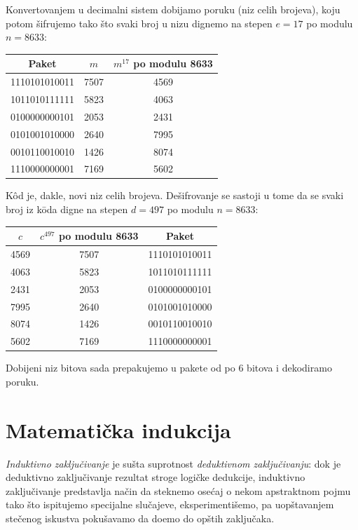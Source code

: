   Konvertovanjem u decimalni sistem dobijamo poruku (niz celih brojeva), koju potom \v sifrujemo tako \v sto svaki broj
  u nizu dignemo na stepen $e = 17$ po modulu $n = 8633$:
  \begin{center}
    \begin{tabular}{c@{\ \ $\to$\ \ }c@{\ \ $\to$\ \ }c}
    Paket & $m$ & $m^{17}$ po modulu 8633 \\
    \hline
    1110101010011 & 7507 & 4569 \\
    1011010111111 & 5823 & 4063 \\
    0100000000101 & 2053 & 2431 \\
    0101001010000 & 2640 & 7995 \\
    0010110010010 & 1426 & 8074 \\
    1110000000001 & 7169 & 5602
    \end{tabular}
  \end{center}
  K\^od je, dakle, novi niz celih brojeva. De\v sifrovanje se sastoji u tome da se svaki broj iz k\=oda digne
  na stepen $d = 497$ po modulu $n = 8633$:
  \begin{center}
    \begin{tabular}{c@{\ \ $\to$\ \ }c@{\ \ $\to$\ \ }c}
     $c$ & $c^{497}$ po modulu 8633 & Paket \\
    \hline
    4569 & 7507 & 1110101010011\\
    4063 & 5823 & 1011010111111\\
    2431 & 2053 & 0100000000101\\
    7995 & 2640 & 0101001010000\\
    8074 & 1426 & 0010110010010\\
    5602 & 7169 & 1110000000001
    \end{tabular}
  \end{center}
  Dobijeni niz bitova sada prepakujemo u pakete od po 6 bitova i dekodiramo poruku.

\section{Matemati\v cka indukcija}

\emph{Induktivno zaklju\v civanje} je su\v sta suprotnost \emph{deduktivnom zaklju\v civanju}:
dok je deduktivno zaklju\v civanje rezultat stroge logi\v cke dedukcije, induktivno zaklju\v civanje
predstavlja na\v cin da steknemo ose\'caj o nekom apstraktnom pojmu tako \v sto ispitujemo
specijalne slu\v cajeve, eksperimenti\v semo, pa uop\v stavanjem ste\v cenog iskustva
poku\v savamo da do\dj emo do op\v stih zaklju\v caka.

